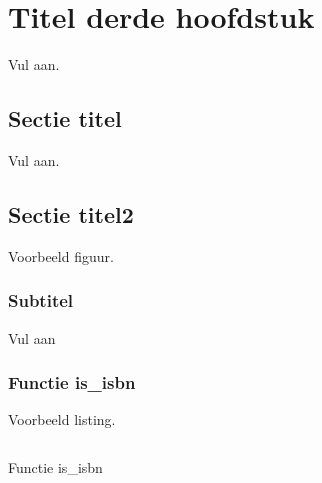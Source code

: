 \chapter{Titel derde hoofdstuk}

Vul aan.


\lipsum[20-24]

\section{Sectie titel}

Vul aan.

\lipsum[32-34]
\section{Sectie titel2}

\lipsum[6-8]

Voorbeeld figuur.

\subsection*{Subtitel}
Vul aan
\subsection{Functie is\_isbn}

Voorbeeld listing.

\begin{listing}[!h]
\inputminted{python}{isbn.py}
\caption{Functie is\_isbn}
\end{listing}
